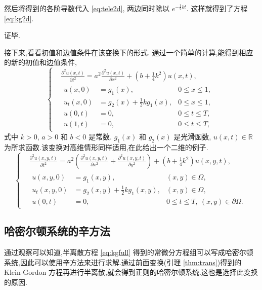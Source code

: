 然后将得到的各阶导数代入 \eqref{eq:tele2d}, 两边同时除以 $e^{-\frac{1}{2}kt}$. 这样就得到了方程 \eqref{eq:kg2d}.

证毕.

接下来,看看初值和边值条件在该变换下的形式. 通过一个简单的计算,能得到相应的新的初值和边值条件,
\begin{equation}\label{eq:kgfull}
\left\lbrace
\begin{aligned}
&\frac{\partial ^2 u(x,t)}{\partial t^2}=a^2 \frac{\partial ^2 u(x,t)}{\partial x^2} + (b+\frac{1}{4}k^2) u(x,t),\\
&\begin{aligned}
u(x,0)&=g_1(x),&0 \le x \le 1,\\
u_t(x,0)&=g_2(x)+\frac{1}{2}k g_1(x),&0 \le x \le 1,\\
u(0,t)&=0,&0 \le t \le T,\\
u(1,t)&=0,&0 \le t \le T,
\end{aligned}
\end{aligned}
\right.
\end{equation}
式中 $k > 0$, $a>0$ 和 $b < 0$ 是常数. $g_1(x)$ 和 $g_2(x)$ 是光滑函数, $u(x,t) \in \mathbb{R}$ 为所求函数.该变换对高维情形同样适用,在此给出一个二维的例子.
\begin{equation*}
\left\lbrace
\begin{aligned}
&\frac{\partial ^2 u(x,y,t)}{\partial t^2}=a^2 (\frac{\partial ^2 u(x,y,t)}{\partial x^2}+ \frac{\partial ^2 u(x,y,t)}{\partial y^2})
+ (b+\frac{1}{4}k^2) u(x,y,t),\\
&\begin{aligned}
u(x,y,0)&=g_1(x,y),&(x,y)\in \Omega,\\
u_t(x,y,0)&=g_2(x,y)+\frac{1}{2}k g_1(x,y),&(x,y)\in \Omega,\\
u(0,t)&=0,&0 \le t \le T,~(x,y)\in \partial\Omega .
\end{aligned}
\end{aligned}
\right.
\end{equation*}

\subsection{哈密尔顿系统的辛方法}
通过观察可以知道,半离散方程 \eqref{eq:kgfull} 得到的常微分方程组可以写成哈密尔顿系统,因此可以使用辛方法来进行求解.通过前面变换(引理 \ref{thm:trans})得到的 Klein-Gordon 方程再进行半离散,就会得到正则的哈密尔顿系统.这也是选择此变换的原因.

